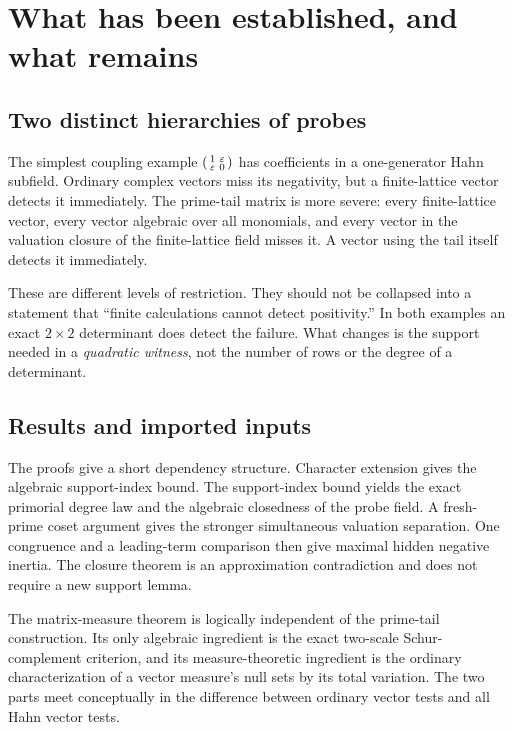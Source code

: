 \documentclass[11pt,oneside]{article}
\theoremstyle{definition}
\theoremstyle{remark}
\newcommand{\eps}{\varepsilon}
\begin{document}
\section{What has been established, and what remains}\label{hnd:sec:scope}

\subsection{Two distinct hierarchies of probes}

The simplest coupling example
$\begin{psmallmatrix}1&\eps\\\eps&0\end{psmallmatrix}$ has coefficients
in a one-generator Hahn subfield. Ordinary complex vectors miss its
negativity, but a finite-lattice vector detects it immediately.
The prime-tail matrix is more severe: every finite-lattice vector, every
vector algebraic over all monomials, and every vector in the valuation
closure of the finite-lattice field misses it. A vector using the tail
itself detects it immediately.

These are different levels of restriction. They should not be collapsed
into a statement that ``finite calculations cannot detect positivity.''
In both examples an exact $2\times2$ determinant does detect the failure.
What changes is the support needed in a \emph{quadratic witness}, not the
number of rows or the degree of a determinant.

\subsection{Results and imported inputs}

The proofs give a short dependency structure. Character extension gives
the algebraic support-index bound. The support-index bound yields the
exact primorial degree law and the algebraic closedness of the probe
field. A fresh-prime coset argument gives the stronger simultaneous
valuation separation. One congruence and a leading-term comparison then
give maximal hidden negative inertia. The closure theorem is an
approximation contradiction and does not require a new support lemma.

The matrix-measure theorem is logically independent of the prime-tail
construction. Its only algebraic ingredient is the exact two-scale
Schur-complement criterion, and its measure-theoretic ingredient is the
ordinary characterization of a vector measure's null sets by its total
variation. The two parts meet conceptually in the difference between
ordinary vector tests and all Hahn vector tests.
\end{document}
